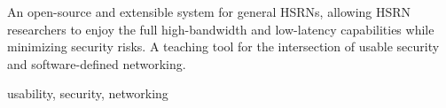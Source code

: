 
An open-source and extensible system for general HSRNs, allowing HSRN researchers to enjoy the full high-bandwidth and low-latency capabilities while minimizing security risks. A teaching tool for the intersection of usable security and software-defined networking.


 usability, security, networking
